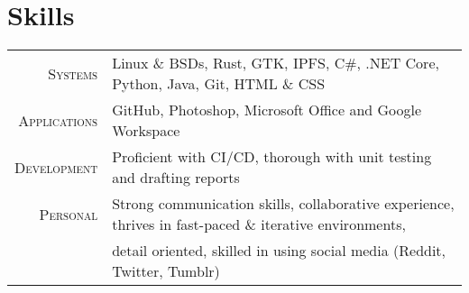 \documentclass[a4paper,10pt]{article} %
\begin{document}

\section{Skills}

\begin{tabular}{rl}
\textsc{Systems} & Linux \& BSDs, Rust, GTK, IPFS, C\#, .NET Core, Python, Java, Git, HTML \& CSS\\
\textsc{Applications} & GitHub, Photoshop, Microsoft Office and Google Workspace\\
\textsc{Development} & Proficient with CI/CD, thorough with unit testing and drafting reports\\
\textsc{Personal} & Strong communication skills, collaborative experience, thrives in fast-paced \& iterative environments,\\& detail oriented, skilled in using social media (Reddit, Twitter, Tumblr)\\

\end{tabular}
\end{document}
